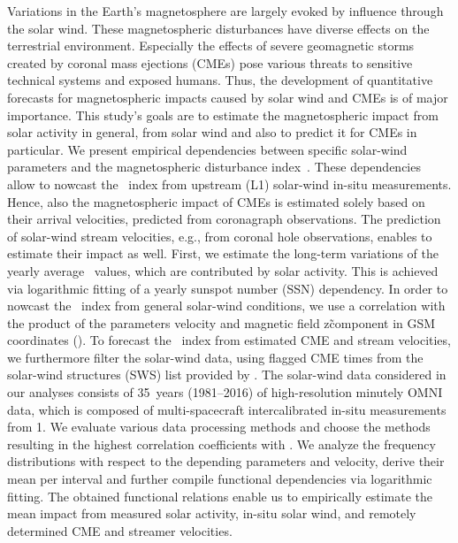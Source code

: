 

% 
% 

\abstracty
{Variations in the Earth's magnetosphere are largely evoked by influence through the solar wind. These magnetospheric disturbances have diverse effects on the terrestrial environment. Especially the effects of severe geomagnetic storms created by coronal mass ejections (CMEs) pose various threats to sensitive technical systems and exposed humans. Thus, the development of quantitative forecasts for magnetospheric impacts caused by solar wind and CMEs is of major importance.}	%
{This study's goals are to estimate the magnetospheric impact from solar activity in general, from solar wind and also to predict it for CMEs in particular. We present empirical dependencies between specific solar-wind parameters and the magnetospheric disturbance index~\Kp{}. These dependencies allow to nowcast the \Kp~index from upstream (L1) solar-wind in-situ measurements. Hence, also the magnetospheric impact of CMEs is estimated solely based on their arrival velocities, predicted from coronagraph observations. The prediction of solar-wind stream velocities, e.g., from coronal hole observations, enables to estimate their impact as well.}	%
{First, we estimate the long-term variations of the yearly average \Kp{}~values, which are contributed by solar activity. This is achieved via logarithmic fitting of a yearly sunspot number (SSN) dependency. In order to nowcast the \Kp~index from general solar-wind conditions, we use a correlation with the product of the parameters velocity and magnetic field z\~component in GSM coordinates (\vBz{}). To forecast the \Kp~index from estimated CME and stream velocities, we furthermore filter the solar-wind data, using flagged CME times from the solar-wind structures (SWS) list provided by \citet{Richardson2012}. The solar-wind data considered in our analyses consists of 35~years (1981--2016) of high-resolution minutely OMNI data, which is composed of multi-spacecraft intercalibrated in-situ measurements from \SI{1}{\au}. We evaluate various data processing methods and choose the methods resulting in the highest correlation coefficients with \Kp{}. We analyze the \Kp{} frequency distributions with respect to the depending parameters \vBz{} and velocity, derive their mean \Kp{} per interval and further compile functional dependencies via logarithmic fitting.}	%
{The obtained functional relations enable us to empirically estimate the mean \Kp{} impact from measured solar activity, in-situ solar wind, and remotely determined CME and streamer velocities.}	%
{}	%

% 
